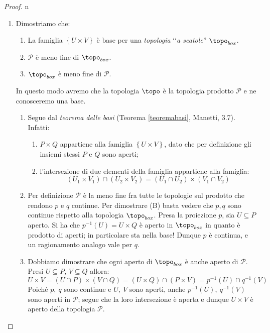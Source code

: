 \begin{proof}{n}~{}
\begin{enumerate}[label=\Roman*]
\item Dimostriamo che:
\begin{enumerate}[label=(\Alph*)]
\item La famiglia $\left\{U\times V\right\}$ è base per una \textit{topologia} ‘‘\textit{a scatole}''  $\topo_{box}$.
\item $\mathcal{P}$ è meno fine di $\topo_{box}$.
\item $\topo_{box}$ è meno fine di $\mathcal{P}$.
\end{enumerate}
In questo modo avremo che la topologia $\topo$ è la topologia prodotto $\mathcal{P}$ e ne conosceremo una base.
\begin{enumerate}[label=\alph*)]
\item Segue dal \textit{teorema delle basi} (Teorema \ref{teoremabasi}, Manetti, 3.7). Infatti:
\begin{enumerate}
\item $P\times Q$ appartiene alla famiglia $\left\{U\times V\right\}$, dato che per definizione gli insiemi stessi $P$ e $Q$ sono aperti;
\item l'intersezione di due elementi della famiglia appartiene alla famiglia:
\begin{equation*}
	\left(U_1\times V_1\right)\cap\left(U_2\times V_2\right)=\left(U_1\cap U_2\right)\times \left(V_1\cap V_2\right)
\end{equation*}
\end{enumerate}
\item Per definizione $\mathcal{P}$ è la meno fine fra tutte le topologie sul prodotto che rendono $p$ e $q$ continue. Per dimostrare (B) basta vedere che $p, q$ sono continue rispetto alla topologia $\topo_{box}$. Presa la proiezione $p$, sia $U\subseteq P$ aperto. Si ha che $p^{-1}\left(U\right)=U\times Q$ è aperto in $\topo_{box}$ in quanto è prodotto di aperti; in particolare sta nella base! Dunque $p$ è continua, e un ragionamento analogo vale per $q$.
\item Dobbiamo dimostrare che ogni aperto di $\topo_{box}$ è anche aperto di $\mathcal{P}$. Presi $U\subseteq P$, $V\subseteq Q$ allora:
\begin{equation*}
U\times V=\left(U\cap P\right)\times\left(V\cap Q\right)=\left(U\times Q\right)\cap \left(P\times V\right)=p^{-1}\left(U\right)\cap q^{-1}\left(V\right)
\end{equation*}
Poiché $p,\ q$ sono continue e $U,\ V$ sono aperti, anche $p^{-1}\left(U\right),\ q^{-1}\left(V\right)$ sono aperti in $\mathcal{P}$; segue che la loro intersezione è aperta e dunque $U\times V$ è aperto della topologia $\mathcal{P}$.

\end{enumerate}
\end{enumerate}
\end{proof}
